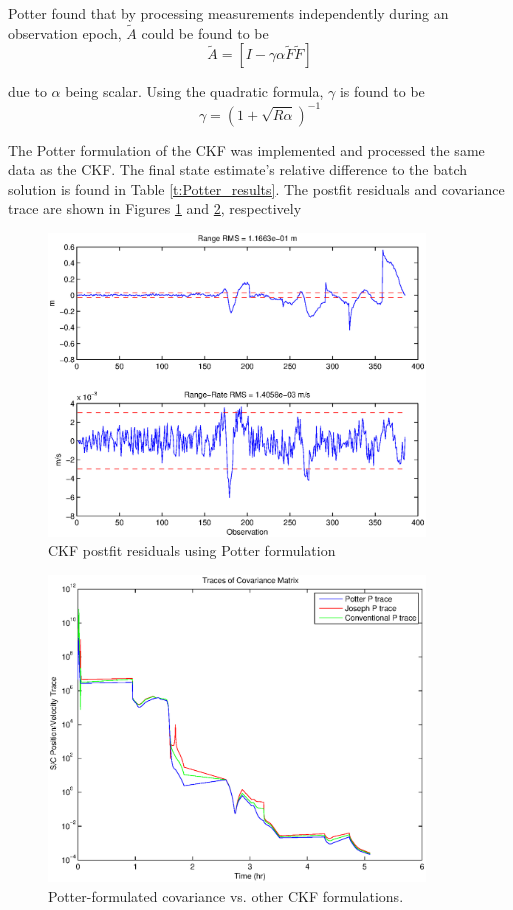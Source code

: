 \documentclass[]{aiaa-tc}%
\begin{document}
	Potter found that by processing measurements independently during an observation epoch, $\tilde{A}$ could be found to be
	\begin{equation}
	\tilde{A}=[I-\gamma\alpha\tilde{F}\tilde{F}]
	\end{equation}

	\noindent due to $\alpha$ being scalar.  Using the quadratic formula, $\gamma$ is found to be 
	\begin{equation}
	\gamma=(1+\sqrt{R\alpha})^{-1}
	\end{equation}

	The Potter formulation of the CKF was implemented and processed the same data as the CKF.  The final state estimate's relative difference to the batch solution is found in Table \ref{t:Potter_results}.  The postfit residuals and covariance trace are shown in Figures \ref{fig:Potter_Postfit} and \ref{fig:Potter_Cov}, respectively

	\begin{figure}[H]
		\centering
		\includegraphics[width = 10cm]{Potter_Postfit.eps}
		\caption{CKF postfit residuals using Potter formulation }
		\label{fig:Potter_Postfit}
	\end{figure}	
	\begin{figure}[H]
		\centering
		\includegraphics[width = 10cm]{Potter_Cov.eps}
		\caption{Potter-formulated covariance vs. other CKF formulations. }
		\label{fig:Potter_Cov}
	\end{figure}	
\end{document}
